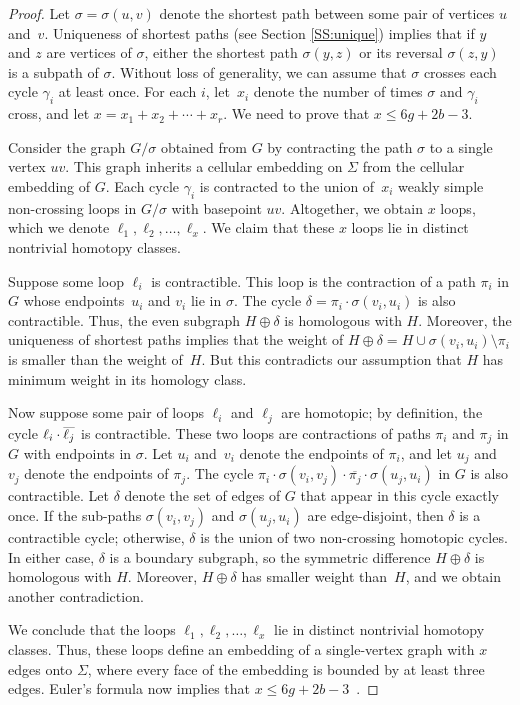 \documentclass[11pt,twoside]{article}
\def\reverse#1{\smash{\overline{#1}}}
\begin{document}
\begin{proof}
Let $\sigma = \sigma(u,v)$ denote the shortest path between some pair of vertices $u$ and~$v$.  Uniqueness of shortest paths (see Section \ref{SS:unique}) implies that if $y$ and $z$ are vertices of $\sigma$, either the shortest path $\sigma(y,z)$ or its reversal $\sigma(z,y)$ is a subpath of $\sigma$.  Without loss of generality, we can assume that $\sigma$ crosses each cycle $\gamma_i$ at least once.  For each $i$, let~$x_i$ denote the number of times $\sigma$ and $\gamma_i$ cross, and let $x = x_1 + x_2 + \cdots + x_r$.  We need to prove that $x\le 6g+2b-3$.

Consider the graph $G/\sigma$ obtained from $G$ by contracting the path $\sigma$ to a single vertex $uv$.  This graph inherits a cellular embedding on $\Sigma$ from the cellular embedding of $G$.  Each cycle $\gamma_i$ is contracted to the union of~$x_i$ weakly simple non-crossing loops in $G/\sigma$ with basepoint $uv$.  Altogether, we obtain $x$ loops, which we denote $\ell_1, \ell_2, \dots, \ell_x$.  We claim that these $x$ loops lie in distinct nontrivial homotopy classes.

Suppose some loop $\ell_i$ is contractible.  This loop is the contraction of a path $\pi_i$ in $G$ whose endpoints~$u_i$ and $v_i$ lie in $\sigma$.  The cycle $\delta = \pi_i \cdot \sigma(v_i,u_i)$ is also contractible.  Thus, the even subgraph $H\oplus\delta$ is homologous with $H$.  Moreover, the uniqueness of shortest paths implies that the weight of $H\oplus\delta = H \cup \sigma(v_i,u_i) \setminus \pi_i$ is smaller than the weight of~$H$.  But this contradicts our assumption that $H $ has minimum weight in its homology class.

Now suppose some pair of loops $\ell_i$ and $\ell_j$ are homotopic; by definition, the cycle $\ell_i\cdot\reverse{\ell_j}$ is contractible.  These two loops are contractions of paths $\pi_i$ and $\pi_j$ in $G$ with endpoints in $\sigma$.  Let $u_i$ and~$v_i$ denote the endpoints of $\pi_i$, and let $u_j$ and~$v_j$ denote the endpoints of $\pi_j$.  The cycle $\pi_i \cdot \sigma(v_i,v_j) \cdot \overline{\pi_j} \cdot \sigma(u_j, u_i)$ in $G$ is also contractible.  Let $\delta$ denote the set of edges of $G$ that appear in this cycle exactly once.  If the sub-paths $\sigma(v_i,v_j)$ and $\sigma(u_j, u_i)$ are edge-disjoint, then $\delta$ is a contractible cycle; otherwise, $\delta$ is the union of two non-crossing homotopic cycles.  In either case, $\delta$ is a boundary subgraph, so the symmetric difference $H\oplus\delta$ is homologous with $H$.  Moreover, $H\oplus\delta$ has smaller weight than~$H$, and we obtain another contradiction.

We conclude that the loops $\ell_1, \ell_2, \dots, \ell_x$ lie in distinct nontrivial homotopy classes.  Thus, these loops define an embedding of a single-vertex graph with $x$ edges onto $\Sigma$, where every face of the embedding is bounded by at least three edges.  Euler's formula now implies that $x\le 6g+2b-3$~\cite[Lemma~2.1]{ccelw-scsih-08}.
\end{proof}
\end{document}
